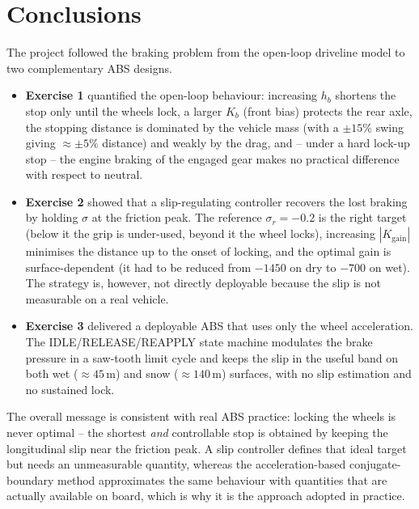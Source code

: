\section{Conclusions}
The project followed the braking problem from the open-loop driveline
model to two complementary ABS designs.
\begin{itemize}
    \item \textbf{Exercise 1} quantified the open-loop behaviour:
          increasing $h_b$ shortens the stop only until the wheels lock,
          a larger $K_b$ (front bias) protects the rear axle, the
          stopping distance is dominated by the vehicle mass (with a
          $\pm15\%$ swing giving $\approx\pm5\%$ distance) and weakly by
          the drag, and -- under a hard lock-up stop -- the engine
          braking of the engaged gear makes no practical difference with
          respect to neutral.
    \item \textbf{Exercise 2} showed that a slip-regulating controller
          recovers the lost braking by holding $\sigma$ at the friction
          peak. The reference $\sigma_r=-0.2$ is the right target
          (below it the grip is under-used, beyond it the wheel locks),
          increasing $|K_\mathrm{gain}|$ minimises the distance up to
          the onset of locking, and the optimal gain is
          surface-dependent (it had to be reduced from $-1450$ on dry to
          $-700$ on wet). The strategy is, however, not directly
          deployable because the slip is not measurable on a real
          vehicle.
    \item \textbf{Exercise 3} delivered a deployable ABS that uses only
          the wheel acceleration. The IDLE/RELEASE/REAPPLY state machine
          modulates the brake pressure in a saw-tooth limit cycle and
          keeps the slip in the useful band on both wet
          ($\approx45$\,m) and snow ($\approx140$\,m) surfaces, with no
          slip estimation and no sustained lock.
\end{itemize}
The overall message is consistent with real ABS practice: locking the
wheels is never optimal -- the shortest \emph{and} controllable stop is
obtained by keeping the longitudinal slip near the friction peak. A
slip controller defines that ideal target but needs an unmeasurable
quantity, whereas the acceleration-based conjugate-boundary method
approximates the same behaviour with quantities that are actually
available on board, which is why it is the approach adopted in practice.
